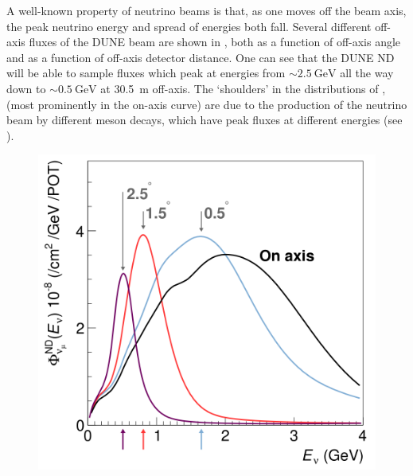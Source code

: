A well-known property of neutrino beams is that, as one moves off the beam axis, the peak neutrino energy and spread of energies both fall.
Several different off-axis \numu fluxes of the DUNE beam are shown in , both as a function of off-axis angle and as a function of off-axis detector distance.
One can see that the DUNE ND will be able to sample fluxes which peak at energies from $\sim\SI{2.5}{\giga\electronvolt}$ all the way down to $\sim\SI{0.5}{\giga\electronvolt}$ at \SI{30.5}{\metre} off-axis.
The `shoulders' in the distributions of , (most prominently in the on-axis curve) are due to the production of the neutrino beam by different meson decays, which have peak fluxes at different energies (see ).

\begin{figure}[h]
  \centering
  \begin{minipage}[t]{0.49\textwidth}
    \includegraphics[width=\linewidth]{files/figures/dune_detector/offAxisFluxes}
  \end{minipage}
  \hfill
  \begin{minipage}[t]{0.49\textwidth}

\end{minipage}
\end{figure}
